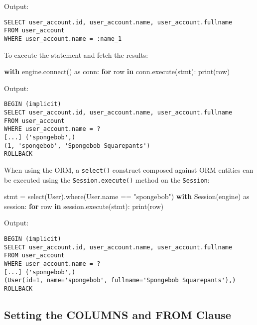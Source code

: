 \documentclass[
  letterpaper,
  DIV=11,
  numbers=noendperiod]{scrreprt}
\newenvironment{Shaded}{\begin{snugshade}}{\end{snugshade}}
\newcommand{\BuiltInTok}[1]{\textcolor[rgb]{0.00,0.23,0.31}{#1}}
\newcommand{\ControlFlowTok}[1]{\textcolor[rgb]{0.00,0.23,0.31}{\textbf{#1}}}
\newcommand{\ExtensionTok}[1]{\textcolor[rgb]{0.00,0.23,0.31}{#1}}
\newcommand{\ImportTok}[1]{\textcolor[rgb]{0.00,0.46,0.62}{#1}}
\newcommand{\KeywordTok}[1]{\textcolor[rgb]{0.00,0.23,0.31}{\textbf{#1}}}
\newcommand{\NormalTok}[1]{\textcolor[rgb]{0.00,0.23,0.31}{#1}}
\newcommand{\OperatorTok}[1]{\textcolor[rgb]{0.37,0.37,0.37}{#1}}
\newcommand{\StringTok}[1]{\textcolor[rgb]{0.13,0.47,0.30}{#1}}
\begin{document}
Output:

\begin{verbatim}
SELECT user_account.id, user_account.name, user_account.fullname
FROM user_account
WHERE user_account.name = :name_1
\end{verbatim}

To execute the statement and fetch the results:

\begin{Shaded}
\begin{Highlighting}[]
\ControlFlowTok{with}\NormalTok{ engine.}\ExtensionTok{connect}\NormalTok{() }\ImportTok{as}\NormalTok{ conn:}
    \ControlFlowTok{for}\NormalTok{ row }\KeywordTok{in}\NormalTok{ conn.execute(stmt):}
        \BuiltInTok{print}\NormalTok{(row)}
\end{Highlighting}
\end{Shaded}

Output:

\begin{verbatim}
BEGIN (implicit)
SELECT user_account.id, user_account.name, user_account.fullname
FROM user_account
WHERE user_account.name = ?
[...] ('spongebob',)
(1, 'spongebob', 'Spongebob Squarepants')
ROLLBACK
\end{verbatim}

When using the ORM, a \texttt{select()} construct composed against ORM
entities can be executed using the \texttt{Session.execute()} method on
the \texttt{Session}:

\begin{Shaded}
\begin{Highlighting}[]
\NormalTok{stmt }\OperatorTok{=}\NormalTok{ select(User).where(User.name }\OperatorTok{==} \StringTok{"spongebob"}\NormalTok{)}
\ControlFlowTok{with}\NormalTok{ Session(engine) }\ImportTok{as}\NormalTok{ session:}
    \ControlFlowTok{for}\NormalTok{ row }\KeywordTok{in}\NormalTok{ session.execute(stmt):}
        \BuiltInTok{print}\NormalTok{(row)}
\end{Highlighting}
\end{Shaded}

Output:

\begin{verbatim}
BEGIN (implicit)
SELECT user_account.id, user_account.name, user_account.fullname
FROM user_account
WHERE user_account.name = ?
[...] ('spongebob',)
(User(id=1, name='spongebob', fullname='Spongebob Squarepants'),)
ROLLBACK
\end{verbatim}

\subsection{Setting the COLUMNS and FROM
Clause}\label{setting-the-columns-and-from-clause}
\end{document}
